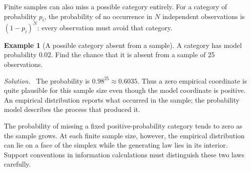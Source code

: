 \documentclass[11pt,oneside,openany]{book}
\theoremstyle{definition}
\newtheorem{example}{Example}[chapter]
\theoremstyle{remark}
\newenvironment{solution}{\par\smallskip\noindent\textit{Solution.}\ }{\par\smallskip}
\numberwithin{equation}{chapter}
\begin{document}
Finite samples can also miss a possible category entirely. For a category of probability $p_i$, the probability of no occurrence in $N$ independent observations is $(1-p_i)^N$: every observation must avoid that category.

\begin{example}[A possible category absent from a sample]
A category has model probability $0.02$. Find the chance that it is absent from a sample of 25 observations.
\begin{solution}
The probability is $0.98^{25}\approx0.6035$. Thus a zero empirical coordinate is quite plausible for this sample size even though the model coordinate is positive. An empirical distribution reports what occurred in the sample; the probability model describes the process that produced it.
\end{solution}
\end{example}

The probability of missing a fixed positive-probability category tends to zero as the sample grows. At each finite sample size, however, the empirical distribution can lie on a face of the simplex while the generating law lies in its interior. Support conventions in information calculations must distinguish these two laws carefully.

\FloatBarrier
\end{document}
